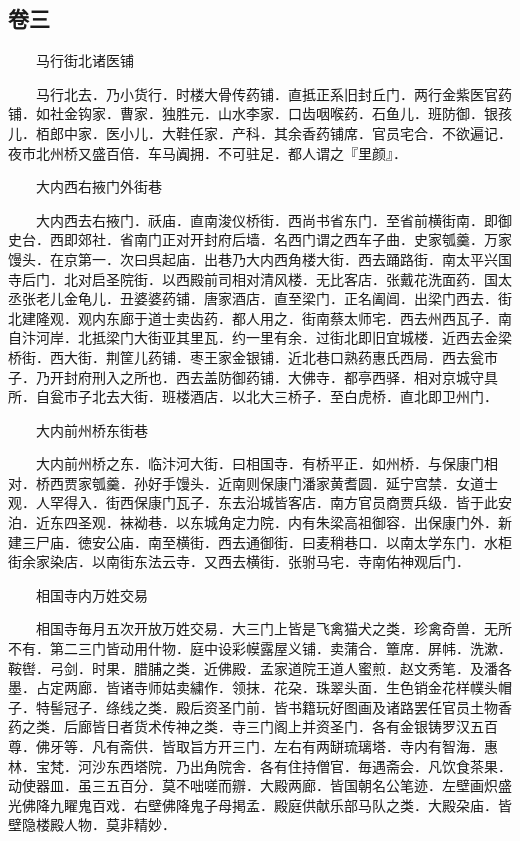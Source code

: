 \hypertarget{ux5377ux4e09}{%
\subsection{卷三}\label{ux5377ux4e09}}

　　马行街北诸医铺

　　马行北去．乃小货行．时楼大骨传药铺．直抵正系旧封丘门．两行金紫医官药铺．如社金钩家．曹家．独胜元．山水李家．口齿咽喉药．石鱼儿．班防御．银孩儿．栢郎中家．医小儿．大鞋任家．产科．其余香药铺席．官员宅合．不欲遍记．夜市北州桥又盛百倍．车马阗拥．不可驻足．都人谓之『里颜』．

　　大内西右掖门外街巷

　　大内西去右掖门．祅庙．直南浚仪桥街．西尚书省东门．至省前横街南．即御史台．西即郊社．省南门正对开封府后墙．名西门谓之西车子曲．史家瓠羹．万家馒头．在京第一．次曰呉起庙．出巷乃大内西角楼大街．西去踊路街．南太平兴国寺后门．北对启圣院街．以西殿前司相对清风楼．无比客店．张戴花洗面药．国太丞张老儿金龟儿．丑婆婆药铺．唐家酒店．直至梁门．正名阖阊．出梁门西去．街北建隆观．观内东廊于道士卖齿药．都人用之．街南蔡太师宅．西去州西瓦子．南自汴河岸．北抵梁门大街亚其里瓦．约一里有余．过街北即旧宜城楼．近西去金梁桥街．西大街．荆筐儿药铺．枣王家金银铺．近北巷口熟药惠氏西局．西去瓮市子．乃开封府刑入之所也．西去盖防御药铺．大佛寺．都亭西驿．相对京城守具所．自瓮市子北去大街．班楼酒店．以北大三桥子．至白虎桥．直北即卫州门．

　　大内前州桥东街巷

　　大内前州桥之东．临汴河大街．曰相国寺．有桥平正．如州桥．与保康门相对．桥西贾家瓠羹．孙好手馒头．近南则保康门潘家黄耆圆．延宁宫禁．女道士观．人罕得入．街西保康门瓦子．东去沿城皆客店．南方官员商贾兵级．皆于此安泊．近东四圣观．袜袎巷．以东城角定力院．内有朱梁高祖御容．出保康门外．新建三尸庙．徳安公庙．南至横街．西去通御街．曰麦稍巷口．以南太学东门．水柜街余家染店．以南街东法云寺．又西去横街．张驸马宅．寺南佑神观后门．

　　相国寺内万姓交易

　　相国寺毎月五次开放万姓交易．大三门上皆是飞禽猫犬之类．珍禽奇兽．无所不有．第二三门皆动用什物．庭中设彩幙露屋义铺．卖蒲合．簟席．屏帏．洗漱．鞍辔．弓剑．时果．腊脯之类．近佛殿．孟家道院王道人蜜煎．赵文秀笔．及潘各墨．占定两廊．皆诸寺师姑卖繍作．领抹．花朶．珠翠头面．生色销金花样幞头帽子．特髻冠子．绦线之类．殿后资圣门前．皆书籍玩好图画及诸路罢任官员土物香药之类．后廊皆日者货术传神之类．寺三门阁上并资圣门．各有金银铸罗汉五百尊．佛牙等．凡有斋供．皆取旨方开三门．左右有两缾琉璃塔．寺内有智海．惠林．宝梵．河沙东西塔院．乃出角院舎．各有住持僧官．毎遇斋会．凡饮食茶果．动使器皿．虽三五百分．莫不咄嗟而辧．大殿两廊．皆国朝名公笔迹．左壁画炽盛光佛降九矅鬼百戏．右壁佛降鬼子母掲孟．殿庭供献乐部马队之类．大殿朶庙．皆壁隐楼殿人物．莫非精妙．

